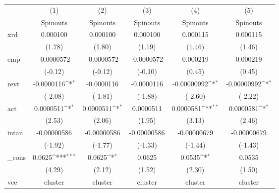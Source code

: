 {
\def\sym#1{\ifmmode^{#1}\else\(^{#1}\)\fi}
\begin{tabular}{l*{5}{c}}
\hline\hline
            &\multicolumn{1}{c}{(1)}&\multicolumn{1}{c}{(2)}&\multicolumn{1}{c}{(3)}&\multicolumn{1}{c}{(4)}&\multicolumn{1}{c}{(5)}\\
            &\multicolumn{1}{c}{Spinouts}&\multicolumn{1}{c}{Spinouts}&\multicolumn{1}{c}{Spinouts}&\multicolumn{1}{c}{Spinouts}&\multicolumn{1}{c}{Spinouts}\\
\hline
xrd         &    0.000100         &    0.000100         &    0.000100         &    0.000115         &    0.000115         \\
            &      (1.78)         &      (1.80)         &      (1.19)         &      (1.46)         &      (1.46)         \\
[1em]
emp         &  -0.0000572         &  -0.0000572         &  -0.0000572         &    0.000219         &    0.000219         \\
            &     (-0.12)         &     (-0.12)         &     (-0.10)         &      (0.45)         &      (0.45)         \\
[1em]
revt        &  -0.0000116\sym{*}  &  -0.0000116         &  -0.0000116         & -0.00000992\sym{*}  & -0.00000992\sym{*}  \\
            &     (-2.08)         &     (-1.81)         &     (-1.88)         &     (-2.60)         &     (-2.22)         \\
[1em]
act         &   0.0000511\sym{*}  &   0.0000511\sym{*}  &   0.0000511         &   0.0000581\sym{**} &   0.0000581\sym{*}  \\
            &      (2.53)         &      (2.06)         &      (1.95)         &      (3.13)         &      (2.46)         \\
[1em]
intan       & -0.00000586         & -0.00000586         & -0.00000586         & -0.00000679         & -0.00000679         \\
            &     (-1.92)         &     (-1.77)         &     (-1.33)         &     (-1.44)         &     (-1.43)         \\
[1em]
\_cons      &      0.0625\sym{***}&      0.0625\sym{*}  &      0.0625         &      0.0535\sym{*}  &      0.0535         \\
            &      (4.29)         &      (2.12)         &      (1.52)         &      (2.30)         &      (1.50)         \\
\hline
vce         &     cluster         &     cluster         &     cluster         &     cluster         &     cluster         \\

\end{tabular}}
